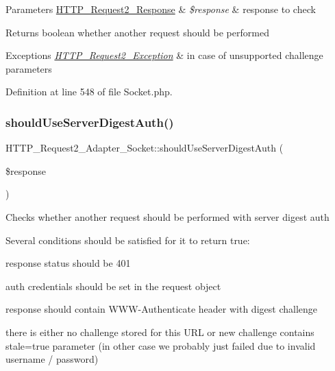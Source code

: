\begin{DoxyParams}[1]{Parameters}
\hyperlink{classHTTP__Request2__Response}{H\+T\+T\+P\+\_\+\+Request2\+\_\+\+Response} & {\em \$response} & response to check\\
\hline
\end{DoxyParams}
\begin{DoxyReturn}{Returns}
boolean whether another request should be performed 
\end{DoxyReturn}

\begin{DoxyExceptions}{Exceptions}
{\em \hyperlink{classHTTP__Request2__Exception}{H\+T\+T\+P\+\_\+\+Request2\+\_\+\+Exception}} & in case of unsupported challenge parameters \\
\hline
\end{DoxyExceptions}


Definition at line 548 of file Socket.\+php.

\hypertarget{classHTTP__Request2__Adapter__Socket_a3d9def9a7ef3725d00b81fa224eedeb3}{}\label{classHTTP__Request2__Adapter__Socket_a3d9def9a7ef3725d00b81fa224eedeb3} 
\subsubsection{\texorpdfstring{should\+Use\+Server\+Digest\+Auth()}{shouldUseServerDigestAuth()}}
{\footnotesize\ttfamily H\+T\+T\+P\+\_\+\+Request2\+\_\+\+Adapter\+\_\+\+Socket\+::should\+Use\+Server\+Digest\+Auth (\begin{DoxyParamCaption}\item[{\hyperlink{classHTTP__Request2__Response}{H\+T\+T\+P\+\_\+\+Request2\+\_\+\+Response}}]{\$response }\end{DoxyParamCaption})\hspace{0.3cm}{\ttfamily [protected]}}

Checks whether another request should be performed with server digest auth

Several conditions should be satisfied for it to return true\+:
\begin{DoxyItemize}
\item response status should be 401
\item auth credentials should be set in the request object
\item response should contain W\+W\+W-\/\+Authenticate header with digest challenge
\item there is either no challenge stored for this U\+RL or new challenge contains stale=true parameter (in other case we probably just failed due to invalid username / password)
\end{DoxyItemize}

